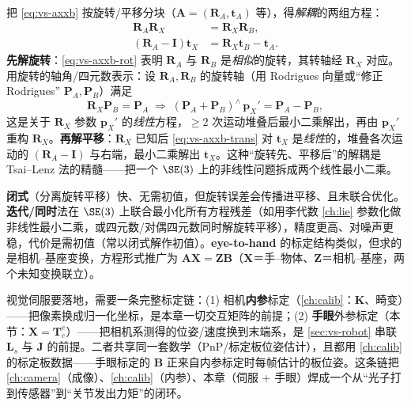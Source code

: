 把 \cref{eq:vs-axxb} 按旋转/平移分块（$\mathbf{A}=(\mathbf{R}_A,\mathbf{t}_A)$ 等），得\emph{解耦}的两组方程\cite{tsai1989hand}：
\begin{align}
  \mathbf{R}_A\mathbf{R}_X&=\mathbf{R}_X\mathbf{R}_B, \label{eq:vs-axxb-rot}\\
  (\mathbf{R}_A-\mathbf{I})\mathbf{t}_X&=\mathbf{R}_X\mathbf{t}_B-\mathbf{t}_A. \label{eq:vs-axxb-trans}
\end{align}
\textbf{先解旋转}：\cref{eq:vs-axxb-rot} 表明 $\mathbf{R}_A$ 与 $\mathbf{R}_B$ 是\emph{相似}的旋转，其转轴经 $\mathbf{R}_X$ 对应。用旋转的轴角/四元数表示：设 $\mathbf{R}_A,\mathbf{R}_B$ 的旋转轴（用 Rodrigues 向量或“修正 Rodrigues” $\mathbf{P}_A,\mathbf{P}_B$）满足
\begin{equation}
  \mathbf{R}_X\mathbf{P}_B=\mathbf{P}_A
  \;\Longrightarrow\;
  (\mathbf{P}_A+\mathbf{P}_B)^\wedge\,\mathbf{p}_X'=\mathbf{P}_A-\mathbf{P}_B,
  \label{eq:vs-tsai-rot}
\end{equation}
这是关于 $\mathbf{R}_X$ 参数 $\mathbf{p}_X'$ 的\emph{线性}方程，$\ge2$ 次运动堆叠后最小二乘解出，再由 $\mathbf{p}_X'$ 重构 $\mathbf{R}_X$\cite{tsai1989hand}。\textbf{再解平移}：$\mathbf{R}_X$ 已知后 \cref{eq:vs-axxb-trans} 对 $\mathbf{t}_X$ 是\emph{线性}的，堆叠各次运动的 $(\mathbf{R}_A-\mathbf{I})$ 与右端，最小二乘解出 $\mathbf{t}_X$。这种“旋转先、平移后”的解耦是 Tsai--Lenz 法的精髓——把一个 $\SE(3)$ 上的非线性问题拆成两个线性最小二乘。

\begin{note}[闭式 vs 迭代；以及 $\mathbf{A}\mathbf{X}=\mathbf{Z}\mathbf{B}$ 推广]\label{note:vs-handeye-variants}
\textbf{闭式}（分离旋转平移）快、无需初值，但旋转误差会传播进平移、且未联合优化\cite{tsai1989hand}。\textbf{迭代/同时}法在 $\SE(3)$ 上联合最小化所有方程残差（如用李代数 \cref{ch:lie} 参数化做非线性最小二乘，或四元数/对偶四元数同时解旋转平移），精度更高、对噪声更稳，代价是需初值（常以闭式解作初值）。\textbf{eye-to-hand} 的标定结构类似，但求的是相机--基座变换，方程形式推广为 $\mathbf{A}\mathbf{X}=\mathbf{Z}\mathbf{B}$（$\mathbf{X}$＝手--物体、$\mathbf{Z}$＝相机--基座，两个未知变换联立）。
\end{note}

\begin{insight}[标定链：内参 + 手眼 = 像素到关节]\label{insight:vs-calib-chain}
视觉伺服要落地，需要一条完整标定链\cite{tsai1989hand,siciliano2009robotics}：(1) 相机\textbf{内参}标定（\cref{ch:calib}：$\mathbf{K}$、畸变）——把像素换成归一化坐标，是本章一切交互矩阵的前提；(2) \textbf{手眼}外参标定（本节：$\mathbf{X}=\mathbf{T}_c^e$）——把相机系测得的位姿/速度换到末端系，是 \cref{sec:vs-robot} 串联 $\mathbf{L}_s$ 与 $\mathbf{J}$ 的前提。二者共享同一套数学（PnP/标定板位姿估计），且都用 \cref{ch:calib} 的标定板数据——手眼标定的 $\mathbf{B}$ 正来自内参标定时每帧估计的板位姿。这条链把 \cref{ch:camera}（成像）、\cref{ch:calib}（内参）、本章（伺服 + 手眼）焊成一个从“光子打到传感器”到“关节发出力矩”的闭环。
\end{insight}


